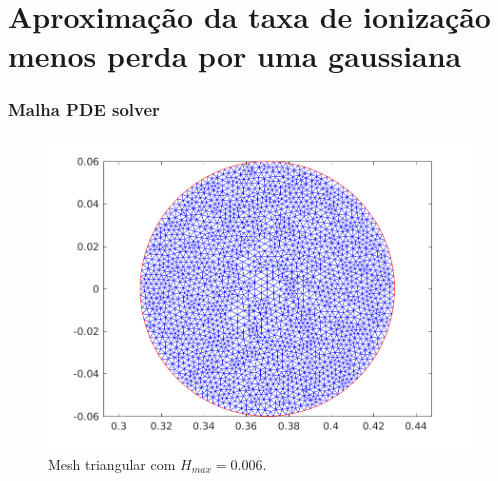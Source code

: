 \documentclass[aspectratio=169]{beamer}
\begin{document}
	
	
	
\section{Aproximação da taxa de ionização menos perda por uma gaussiana}
   
\begin{frame}
		\frametitle{Malha PDE solver}
			
	\begin{figure}[H]
	\includegraphics[width=.5\linewidth]{../SImulacao_breakdown/PDE/malha.png}  
	\caption{Mesh triangular com $H_{max}=0.006$.} 	
			\centering
			\end{figure}	
	\end{frame}
	
\end{document}
